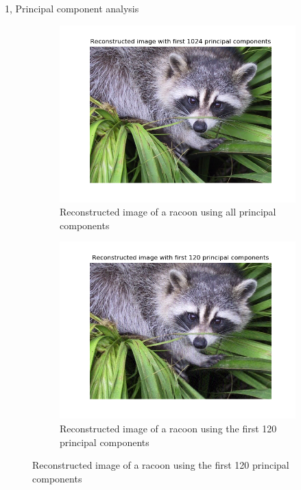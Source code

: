 \documentclass[10pt,a4paper]{article}
\begin{document}
\begin{task}{1, Principal component analysis}
\begin{figure}[H]
\centering
\begin{subfigure}[b]{0.475\textwidth}
\centering
\includegraphics[width=\textwidth]{../plots/task1/task1_2_firstall.png}
\caption[]
{{\small Reconstructed image of a racoon using all principal components}}
\label{fig:task1_part2_all}
\end{subfigure}
\hfill
\begin{subfigure}[b]{0.475\textwidth}
\centering
\includegraphics[width=\textwidth]{../plots/task1/task1_2_first120.png}
\caption[]
{{\small Reconstructed image of a racoon using the first 120 principal components}}
\label{fig:task1_part2_120}
\end{subfigure}

\end{figure}
\end{task}
\end{document}

